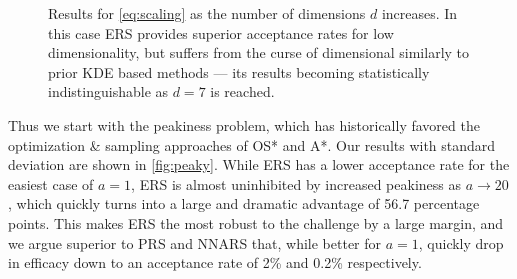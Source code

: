 \documentclass{ecai}  %
\begin{document}
\begin{figure}
%
%
%
%
%
\caption{Results for \autoref{eq:scaling} as the number of dimensions $d$ increases. In this case ERS provides superior acceptance rates for low dimensionality, but suffers from the curse of dimensional similarly to prior KDE based methods --- its results becoming statistically indistinguishable as $d=7$ is reached. }
\label{fig:dimensions}
%
%
\end{figure}




Thus we start with the peakiness problem, which has historically favored the optimization \& sampling approaches of OS* and A*. Our results with standard deviation are shown in \autoref{fig:peaky}. While ERS has a lower acceptance rate for the easiest case of $a=1$, ERS is almost uninhibited by increased peakiness as $a \to 20$, which quickly turns into a large and dramatic advantage of 56.7 percentage points. This makes ERS the most robust to the challenge by a large margin, and we argue superior to PRS and NNARS that, while better for $a = 1$, quickly drop in efficacy down to an acceptance rate of 2\% and 0.2\% respectively. 
\end{document}
